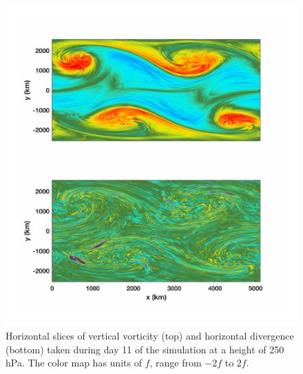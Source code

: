 \begin{figure}[H]
\vspace{-2em}
\includegraphics[scale=1]{Chapter3/img/vortDivDay11_height_75}
\caption{Horizontal slices of vertical vorticity (top) and horizontal divergence (bottom) taken during day 11 of the simulation at a height of 250 hPa. The color map has units of $f$, range from $-2f$ to $2f$.}
\label{fig:vortDivDay11_height_75}
\end{figure}

